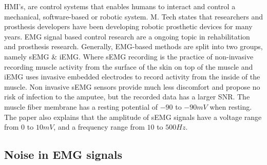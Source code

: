 \documentclass[../main.tex]{subfiles}
\begin{document}
\gls{HMI}'s, are control systems that enables humans to interact and control a mechanical, software-based or robotic system.
M. Tech \cite{Tech2015} states that researchers and prosthesis developers have been developing robotic prosthetic devices for many years.
\gls{EMG} signal based control research are a ongoing topic in rehabilitation and prosthesis research.
Generally, \gls{EMG}-based methods are split into two groups, namely \gls{sEMG} \& \gls{iEMG}.
Where \gls{sEMG} recording is the practice of non-invasive recording muscle activity from the surface of the skin on top of the muscle and \gls{iEMG} uses invasive embedded electrodes to record activity from the inside of the muscle.
Non invasive \gls{sEMG} sensors provide much less discomfort and propose no risk of infection to the amputee, but the recorded data has a larger \gls{SNR}.
The muscle fiber membrane has a resting potential of $-90$ to $-90 mV$ when resting. The paper also explains that the amplitude of sEMG signals have a voltage range from $0$ to $10 mV$, and a frequency range from $10$ to $500 Hz$.

\subsection{Noise in EMG signals}
\label{sec:noise}
\end{document}
